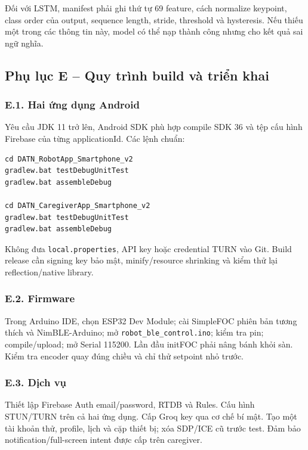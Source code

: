 Đối với LSTM, manifest phải ghi thứ tự 69 feature, cách normalize keypoint, class order của output, sequence length, stride, threshold và hysteresis. Nếu thiếu một trong các thông tin này, model có thể nạp thành công nhưng cho kết quả sai ngữ nghĩa.

\subsection*{Phụ lục E -- Quy trình build và triển khai}

\subsubsection*{E.1. Hai ứng dụng Android}

Yêu cầu JDK 11 trở lên, Android SDK phù hợp compile SDK 36 và tệp cấu hình Firebase của từng applicationId. Các lệnh chuẩn:

\begin{lstlisting}[caption={Build và unit test Android trên Windows}]
cd DATN_RobotApp_Smartphone_v2
gradlew.bat testDebugUnitTest
gradlew.bat assembleDebug

cd DATN_CaregiverApp_Smartphone_v2
gradlew.bat testDebugUnitTest
gradlew.bat assembleDebug
\end{lstlisting}

Không đưa \texttt{local.properties}, API key hoặc credential TURN vào Git. Build release cần signing key bảo mật, minify/resource shrinking và kiểm thử lại reflection/native library.

\subsubsection*{E.2. Firmware}

Trong Arduino IDE, chọn ESP32 Dev Module; cài SimpleFOC phiên bản tương thích và NimBLE-Arduino; mở \texttt{robot\_ble\_control.ino}; kiểm tra pin; compile/upload; mở Serial 115200. Lần đầu initFOC phải nâng bánh khỏi sàn. Kiểm tra encoder quay đúng chiều và chỉ thử setpoint nhỏ trước.

\subsubsection*{E.3. Dịch vụ}

Thiết lập Firebase Auth email/password, RTDB và Rules. Cấu hình STUN/TURN trên cả hai ứng dụng. Cấp Groq key qua cơ chế bí mật. Tạo một tài khoản thử, profile, lịch và cặp thiết bị; xóa SDP/ICE cũ trước test. Đảm bảo notification/full-screen intent được cấp trên caregiver.

